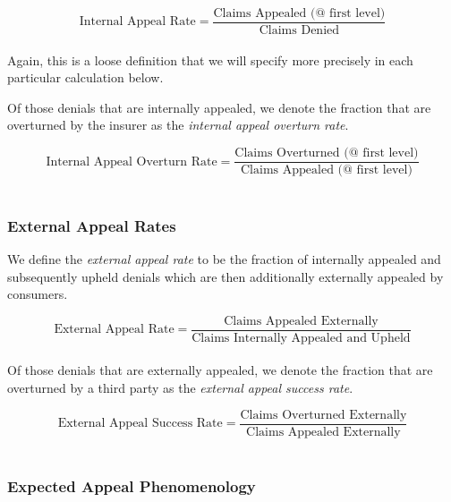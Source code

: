 \documentclass[12pt, a4paper,twoside,parskip=full]{report}
\theoremstyle{plain} %
\theoremstyle{definition} %
\theoremstyle{remark} %
\numberwithin{equation}{chapter}
\begin{document}
		\begin{equation*}
			\text{Internal Appeal Rate} = \dfrac{\text{Claims Appealed (@ first level)}}{\text{Claims Denied}}
		\end{equation*}
		\hfill\\
		
		Again, this is a loose definition that we will specify more precisely in each particular calculation below.
		
		Of those denials that are internally appealed, we denote the fraction that are overturned by the insurer as the \emph{internal appeal overturn rate}.
		
		\begin{equation*}
			\text{Internal Appeal Overturn Rate} = \dfrac{\text{Claims Overturned (@ first level)}}{\text{Claims Appealed (@ first level)}}
		\end{equation*}
		\hfill\\
		
		
		\subsubsection{External Appeal Rates}
		
		We define the \emph{external appeal rate} to be the fraction of internally appealed and subsequently upheld denials which are then additionally externally appealed by consumers.
		
		\begin{equation*}
			\text{External Appeal Rate} = \dfrac{\text{Claims Appealed Externally}}{\text{Claims Internally Appealed and Upheld}}
		\end{equation*}
		\hfill\\
		
		
		Of those denials that are externally appealed, we denote the fraction that are overturned by a third party as the \emph{external appeal success rate}.
		
		\begin{equation*}
			\text{External Appeal Success Rate} = \dfrac{\text{Claims Overturned Externally}}{\text{Claims Appealed Externally}}
		\end{equation*}
		\hfill\\
		
		
		\subsubsection{Expected Appeal Phenomenology}
		
\end{document}
